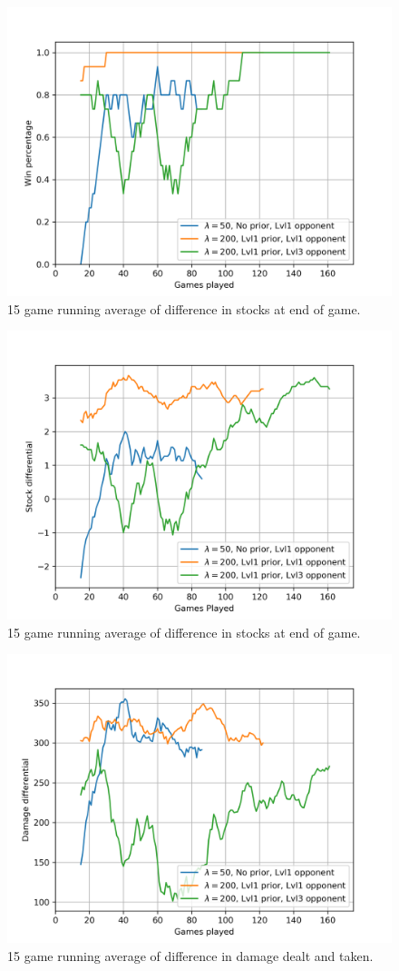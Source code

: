 \begin{figure}[!htb]
\centering
	\includegraphics[width=120mm]{winpctg.png}
	\caption{15 game running average of difference in stocks at end of game. \label{winpctg}}
\end{figure}

\begin{figure}[!htb]
\centering
	\includegraphics[width=120mm]{stocks.png}
	\caption{15 game running average of difference in stocks at end of game. \label{stocks}}
\end{figure}

\begin{figure}[!htb]
\centering
	\includegraphics[width=120mm]{damage.png}
	\caption{15 game running average of difference in damage dealt and taken. \label{damage}}
\end{figure}
